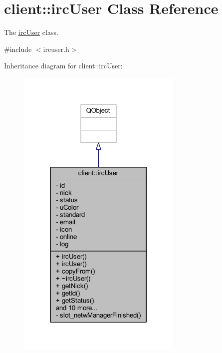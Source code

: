 \hypertarget{classclient_1_1irc_user}{\section{client\-:\-:irc\-User Class Reference}
\label{d6/d69/classclient_1_1irc_user}
}


The \hyperlink{classclient_1_1irc_user}{irc\-User} class.  




{\ttfamily \#include $<$ircuser.\-h$>$}



Inheritance diagram for client\-:\-:irc\-User\-:\nopagebreak
\begin{figure}[H]
\begin{center}
\leavevmode
\includegraphics[width=224pt]{d9/d35/classclient_1_1irc_user__inherit__graph}
\end{center}
\end{figure}



